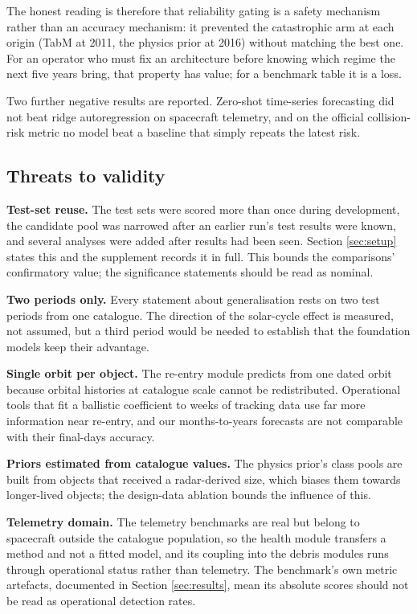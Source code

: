 \documentclass[3p,times,twocolumn]{elsarticle}
\begin{document}
The honest reading is therefore that reliability gating is a safety
mechanism rather than an accuracy mechanism: it prevented the
catastrophic arm at each origin (TabM at 2011, the physics prior at
2016) without matching the best one. For an operator who must fix an
architecture before knowing which regime the next five years bring, that
property has value; for a benchmark table it is a loss.

Two further negative results are reported. Zero-shot time-series
forecasting did not beat ridge autoregression on spacecraft telemetry,
and on the official collision-risk metric no model beat a baseline that
simply repeats the latest risk.

\subsection{Threats to validity}\label{threats-to-validity}

\textbf{Test-set reuse.} The test sets were scored more than once during
development, the candidate pool was narrowed after an earlier run's test
results were known, and several analyses were added after results had
been seen. Section \ref{sec:setup} states this and the supplement
records it in full. This bounds the comparisons' confirmatory value; the
significance statements should be read as nominal.

\textbf{Two periods only.} Every statement about generalisation rests on
two test periods from one catalogue. The direction of the solar-cycle
effect is measured, not assumed, but a third period would be needed to
establish that the foundation models keep their advantage.

\textbf{Single orbit per object.} The re-entry module predicts from one
dated orbit because orbital histories at catalogue scale cannot be
redistributed. Operational tools that fit a ballistic coefficient to
weeks of tracking data use far more information near re-entry, and our
months-to-years forecasts are not comparable with their final-days
accuracy.

\textbf{Priors estimated from catalogue values.} The physics prior's
class pools are built from objects that received a radar-derived size,
which biases them towards longer-lived objects; the design-data ablation
bounds the influence of this.

\textbf{Telemetry domain.} The telemetry benchmarks are real but belong
to spacecraft outside the catalogue population, so the health module
transfers a method and not a fitted model, and its coupling into the
debris modules runs through operational status rather than telemetry.
The benchmark's own metric artefacts, documented in Section
\ref{sec:results}, mean its absolute scores should not be read as
operational detection rates.
\end{document}
